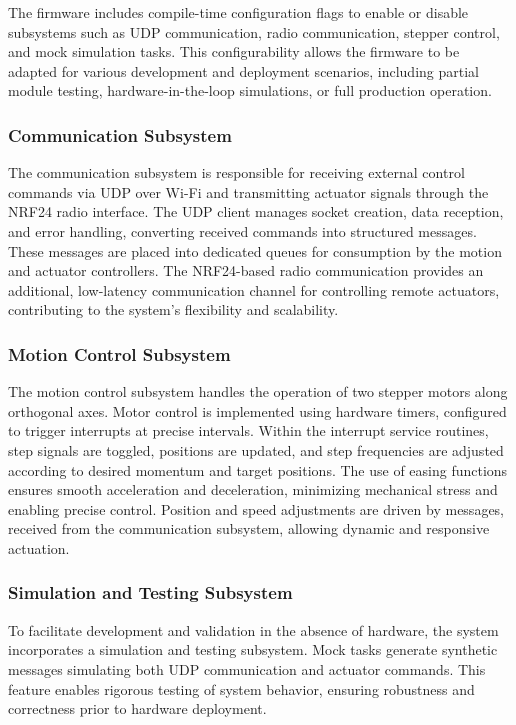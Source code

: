 The firmware includes compile-time configuration flags to enable or disable subsystems such as UDP communication, radio communication, stepper control, and mock simulation tasks. This configurability allows the firmware to be adapted for various development and deployment scenarios, including partial module testing, hardware-in-the-loop simulations, or full production operation.

\subsubsection{Communication Subsystem}
The communication subsystem is responsible for receiving external control commands via UDP over Wi-Fi and transmitting actuator signals through the NRF24 radio interface. The UDP client manages socket creation, data reception, and error handling, converting received commands into structured messages. These messages are placed into dedicated queues for consumption by the motion and actuator controllers. The NRF24-based radio communication provides an additional, low-latency communication channel for controlling remote actuators, contributing to the system's flexibility and scalability.

\subsubsection{Motion Control Subsystem}
The motion control subsystem handles the operation of two stepper motors along orthogonal axes. Motor control is implemented using hardware timers, configured to trigger interrupts at precise intervals. Within the interrupt service routines, step signals are toggled, positions are updated, and step frequencies are adjusted according to desired momentum and target positions. The use of easing functions ensures smooth acceleration and deceleration, minimizing mechanical stress and enabling precise control. Position and speed adjustments are driven by messages, received from the communication subsystem, allowing dynamic and responsive actuation.

\subsubsection{Simulation and Testing Subsystem}
To facilitate development and validation in the absence of hardware, the system incorporates a simulation and testing subsystem. Mock tasks generate synthetic messages simulating both UDP communication and actuator commands. This feature enables rigorous testing of system behavior, ensuring robustness and correctness prior to hardware deployment.

